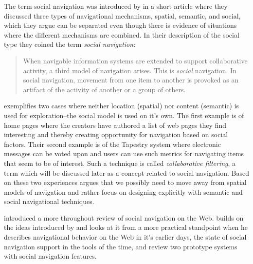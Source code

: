 The term social navigation was introduced by \citet{dourish94} in a short
article where they discussed three types of navigational mechanisms, spatial,
semantic, and social, which they argue can be separated even though there is
evidence of situations where the different mechanisms are combined.
In their description of the social type they coined the term
\emph{social navigation}:

\begin{quote}
  When navigable information systems are extended to support collaborative
  activity, a third model of navigation arises. This is \emph{social}
  navigation. In social navigation, movement from one item to another is
  provoked as an artifact of the activity of another or a group of others.
  \citep[p.~1]{dourish94}
\end{quote}

\citeauthor{dourish94} exemplifies two cases where neither location
(spatial) nor content (semantic) is used for exploration--the social model
is used on it's own. The first example is of home pages where the creators
have authored a list of web pages they find interesting and thereby creating
opportunity for navigation based on social factors. Their second example
is of the Tapestry \citep{gold berg92} system where electronic messages can be
voted upon and users can use such metrics for navigating items that seem to be
of interest. Such a technique is called \emph{collaborative filtering},
a term which will be discussed later as a concept related to social navigation.
Based on these two experiences \citeauthor{dourish94} argues that we possibly
need to move away from spatial models of navigation and rather focus on
designing explicitly with semantic and social navigational techniques.

\citet{dieberger97} introduced a more throughout review of social navigation on
the Web. \citeauthor{dieberger97} builds on the ideas introduced by
\citeauthor{dourish94} and looks at it from a more practical standpoint when
he describes navigational behavior on the Web in it's earlier days, the state
of social navigation support in the tools of the time, and review two
prototype systems with social navigation features.
